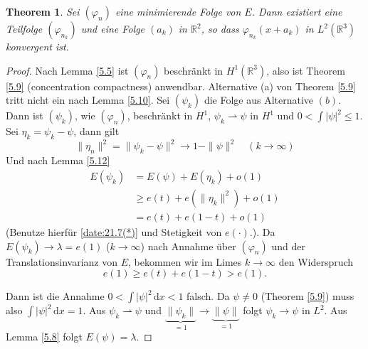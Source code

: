 \documentclass[
paper=a4,
bibtotocnumbered,
liststotocnumbered,
tablecaptionabove,
pointlessnumbers,
twoside,
openright,
10pt
]
{report}
\let\phi\varphi
\newtheorem{thm}{Theorem}[chapter]
\theoremstyle{definition}
\numberwithin{equation}{chapter}
\begin{document}
\begin{thm}\label{5.13}
Sei $(\phi_n)$ eine minimierende Folge von $E$. Dann existiert eine Teilfolge $(\phi_{n_k})$ und eine Folge $(a_k)$ in $\mathbb R^2$, so dass $\phi_{n_k} (x+a_k)$ in $L^2(\mathbb R^3)$ konvergent ist.  
\end{thm}
\begin{proof}
Nach Lemma \ref{5.5} ist $(\phi_n)$ beschränkt in $H^1(\mathbb R^3)$, also ist Theorem \ref{5.9} (concentration compactness) anwendbar. Alternative (a) von Theorem \ref{5.9} tritt nicht ein nach Lemma \ref{5.10}. Sei $(\psi_k)$ die Folge aus Alternative $(b)$. Dann ist $(\psi_k)$, wie $(\phi_n)$, beschränkt in $H^1$, $\psi_k \rightharpoonup \psi$ in $H^1$ und $0 < \int |\psi|^2\le 1$. Sei $\eta_k = \psi_k - \psi$, dann gilt
\begin{equation}\label{date:21.7(*)}
\| \eta_n \|^2 = \|\psi_k - \psi\|^2 \to 1- \| \psi\|^2 \quad (k\to \infty)
\end{equation}
Und nach Lemma \ref{5.12} 
\begin{align}
E(\psi_k) &= E(\psi) + E(\eta_k) + o(1)\\
&\ge e(t) + e(\| \eta_k\|^2) + o(1)\\
&= e(t) + e(1-t) + o(1)
\end{align}
(Benutze hierfür \eqref{date:21.7(*)} und Stetigkeit von $e(\cdot)$.). Da $E(\psi_k) \to \lambda = e(1)$ ($k\to \infty$) nach Annahme über $(\phi_n)$ und der Translationsinvarianz von $E$, bekommen wir im Limes $k\to \infty$ den Widerspruch $$e(1)\ge e(t) + e(1-t) > e(1).$$

Dann ist die Annahme $0 < \int |\psi|^2 \, \mathrm dx <1$ falsch. Da $\psi \neq 0$ (Theorem \ref{5.9}) muss also $\int |\psi|^2 \, \mathrm dx =1$. Aus $\psi_k \rightharpoonup \psi$ und $\underbrace{\|\psi_k \|}_{=1} \to \underbrace{\| \psi\|}_{=1}$ folgt $\psi_k \to \psi$ in $L^2$.  Aus Lemma \ref{5.8} folgt $E(\psi)=\lambda$.
\end{proof}

\appendix
\end{document}
